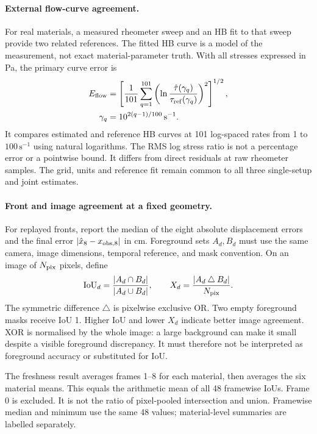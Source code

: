 \paragraph{External flow-curve agreement.}
For real materials, a measured rheometer sweep and an HB fit to that
sweep provide two related references. The fitted HB curve is a model
of the measurement, not exact material-parameter truth. With all
stresses expressed in Pa, the primary curve error is
\begin{equation}
\label{eq:E}
\begin{aligned}
 E_{\rm flow}&=\left[\frac1{101}\sum_{q=1}^{101}
      \left(\ln\frac{\hat\tau(\gamma_q)}{\tau_{\rm ref}(\gamma_q)}
      \right)^2\right]^{1/2},\\
 \gamma_q&=10^{2(q-1)/100}\,\mathrm{s}^{-1}.
\end{aligned}
\end{equation}
It compares estimated and reference HB curves at 101 log-spaced
rates from 1 to $100\,\mathrm{s}^{-1}$ using natural logarithms.
The RMS log stress ratio is not a percentage error or a pointwise
bound. It differs from direct residuals at raw rheometer samples.
The grid, units and reference fit remain common to all three
single-setup and joint estimates.

\paragraph{Front and image agreement at a fixed geometry.}
For replayed fronts, report the median of the eight absolute
displacement errors and the final error $|\hat x_8-x_{{\rm obs},8}|$
in cm. Foreground sets $A_d,B_d$ must use the same camera, image
dimensions, temporal reference, and mask convention. On an image
of $N_{\rm pix}$ pixels, define
\begin{equation}
\label{eq:mask-metrics}
 \mathrm{IoU}_d=\frac{|A_d\cap B_d|}{|A_d\cup B_d|},\qquad
 X_d=\frac{|A_d\mathbin{\triangle}B_d|}{N_{\rm pix}}.
\end{equation}
The symmetric difference $\triangle$ is pixelwise exclusive OR.
Two empty foreground masks receive IoU 1. Higher IoU and lower
$X_d$ indicate better image agreement. XOR is normalised by the
whole image: a large background can make it small despite a visible
foreground discrepancy. It must therefore not be interpreted as
foreground accuracy or substituted for IoU.

The freshness result averages frames 1--8 for each material, then
averages the six material means. This equals the arithmetic mean of
all 48 framewise IoUs. Frame 0 is excluded. It is not the ratio of
pixel-pooled intersection and union. Framewise median and minimum use
the same 48 values; material-level summaries are labelled separately.

